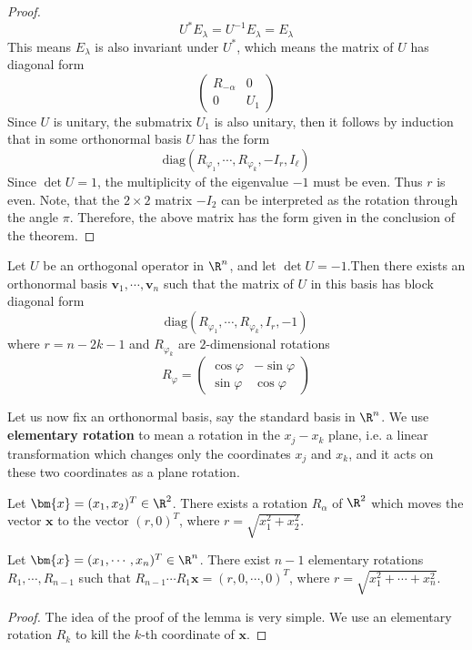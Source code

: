 \begin{proof}
\[U^*E_\lambda=U^{-1}E_\lambda=E_\lambda\]
This means $E_\lambda$ is also invariant under $U^*$, which means the matrix of $U$ has diagonal form
\[\begin{pmatrix}
R_{-\alpha}&0\\
0&U_1
\end{pmatrix}\]
Since $U$ is unitary, the submatrix $U_1$ is also unitary, then it follows by induction that in some orthonormal basis $U$ has the form
\[\mathrm{diag}(R_{\varphi_1},\cdots,R_{\varphi_k},-I_r,I_\ell)\]
Since $\det U=1$, the multiplicity of the eigenvalue $-1$ must be even. Thus $r$ is even. Note, that the $2\times2$ matrix $-I_2$ can be interpreted as the rotation through the angle $\pi$. Therefore, the above matrix has the form given in the conclusion of the theorem.
\end{proof}
\begin{theorem}\label{orthogonal det=-1}
Let $U$ be an orthogonal operator in $\R^n$, and let $\det U=-1$.Then there exists an orthonormal basis $\bm{v}_1,\cdots,\bm{v}_n$ such that the matrix of $U$ in this basis has block diagonal form
\[\mathrm{diag}(R_{\varphi_1},\cdots,R_{\varphi_k},I_r,-1)\]
where $r=n-2k-1$ and $R_{\varphi_k}$ are $2$-dimensional rotations
\[R_{\varphi}=\begin{pmatrix}
\cos\varphi&-\sin\varphi\\
\sin\varphi&\cos\varphi
\end{pmatrix}\]
\end{theorem}
Let us now fix an orthonormal basis, say the standard basis in $\R^n$. We use \textbf{elementary rotation} to mean a rotation in the $x_j-x_k$ plane, i.e. a linear transformation which changes only the coordinates $x_j$ and $x_k$, and it acts on these two coordinates as a plane rotation.
\begin{lemma}
Let $\bm{x}=(x_1,x_2)^T\in\R^2$. There exists a rotation $R_\alpha$ of $\R^2$ which moves the vector $\bm{x}$ to the vector $(r,0)^T$, where $r=\sqrt{x_1^2+x_2^2}$.
\end{lemma}
\begin{lemma}\label{rotation kill coordinate}
Let $\bm{x}=(x_1,\cdots,x_n)^T\in\R^n$. There exist $n-1$ elementary rotations $R_1,\cdots,R_{n-1}$ such that $R_{n-1}\cdots R_1\bm{x}=(r,0,\cdots,0)^T$, where $r=\sqrt{x_1^2+\cdots+x_n^2}$.
\end{lemma}
\begin{proof}
The idea of the proof of the lemma is very simple. We use an elementary rotation $R_k$ to kill the $k$-th coordinate of $\bm{x}$.
\end{proof}
